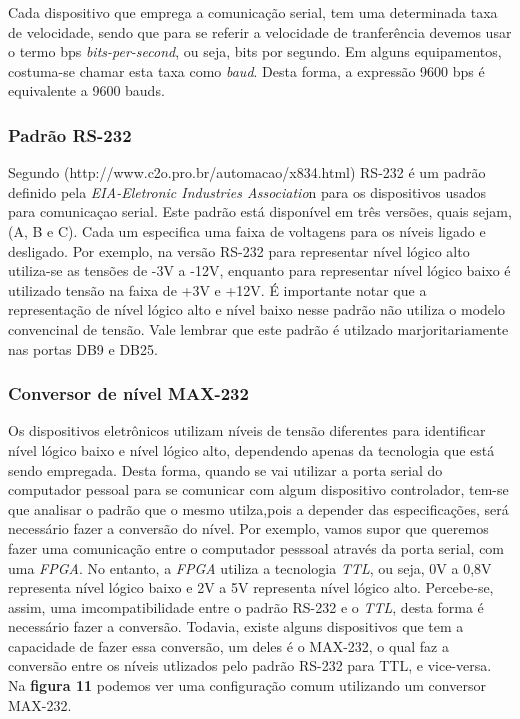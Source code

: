 \documentclass[12pt]{article}
\begin{document}




Cada dispositivo que emprega a comunicação serial, tem uma determinada taxa de velocidade, sendo que para se referir a velocidade de tranferência devemos usar o termo bps \textit{bits-per-second}, ou seja, bits por segundo. Em alguns equipamentos, costuma-se chamar esta taxa  como \textit{baud}. Desta forma, a expressão 9600 bps é equivalente a 9600 bauds.

\subsubsection{Padrão RS-232}
Segundo (http://www.c2o.pro.br/automacao/x834.html) RS-232 é um padrão definido pela \textit{EIA-Eletronic Industries Associatio}n para os dispositivos usados para comunicaçao serial. Este padrão está disponível em três versões, quais sejam, (A, B e C). Cada um especifica uma faixa de voltagens para os níveis ligado e desligado. Por exemplo, na versão RS-232 para representar  nível lógico alto utiliza-se as tensões de -3V a -12V, enquanto para representar nível lógico baixo é utilizado tensão na faixa de +3V e +12V. É importante notar que a representação de nível lógico alto e nível baixo nesse padrão não utiliza o modelo convencinal de tensão. Vale lembrar que este padrão é utilzado marjoritariamente nas portas DB9 e DB25.  

\subsubsection{Conversor de nível MAX-232}
Os dispositivos eletrônicos utilizam níveis de tensão diferentes para identificar nível lógico baixo e nível lógico alto, dependendo apenas da tecnologia que está sendo empregada. Desta forma, quando se vai utilizar a porta serial do computador pessoal para se comunicar com algum dispositivo controlador, tem-se que analisar o padrão que o mesmo utilza,pois a depender das especificações, será necessário fazer a conversão do nível. Por exemplo, vamos supor que queremos fazer uma comunicação entre o computador pesssoal através da porta serial, com uma \textit{FPGA}. No entanto, a \textit{FPGA} utiliza a tecnologia \textit{TTL}, ou seja, 0V a 0,8V representa nível lógico baixo e 2V a 5V representa nível lógico alto. Percebe-se, assim, uma imcompatibilidade entre o padrão RS-232 e o \textit{TTL}, desta forma é necessário fazer a conversão. Todavia, existe alguns dispositivos que tem a capacidade de fazer essa conversão, um deles é o MAX-232, o qual faz  a conversão entre os níveis utlizados pelo padrão RS-232 para TTL, e vice-versa. Na \textbf{figura 11} podemos ver uma configuração comum utilizando um conversor MAX-232. 
\end{document}
